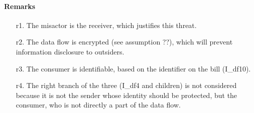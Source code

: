 \paragraph{Remarks}
\begin{enumerate}
	\item[r1.] The misactor is the receiver, which justifies this threat.
	\item[r2.] The data flow is encrypted (see assumption ??), which will prevent
	information disclosure to outsiders.
	\item[r3.] The consumer is identifiable, based on the identifier on the bill
	(I_df10).
	\item[r4.] The right branch of the three (I_df4 and children) is not considered
	because it is not the sender whose identity should be protected, but the
	consumer, who is not directly a part of the data flow.
\end{enumerate}
